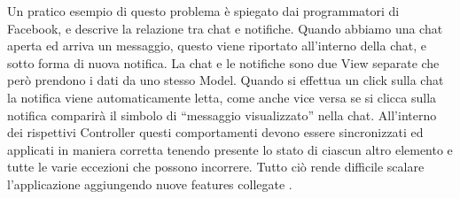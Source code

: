 Un pratico esempio di questo problema è spiegato dai programmatori di Facebook, e descrive la relazione tra chat e notifiche. Quando abbiamo una chat aperta ed arriva un messaggio, questo viene riportato all'interno della chat, e sotto forma di nuova notifica. La chat e le notifiche sono due View separate che però prendono i dati da uno stesso Model. Quando si effettua un click sulla chat la notifica viene automaticamente letta, come anche vice versa se si clicca sulla notifica comparirà il simbolo di “messaggio visualizzato” nella chat.
All'interno dei rispettivi Controller questi comportamenti devono essere sincronizzati ed applicati in maniera corretta tenendo presente lo stato di ciascun altro elemento e tutte le varie eccezioni che possono incorrere. Tutto ciò rende difficile scalare l'applicazione aggiungendo nuove features collegate \cite{JingChenOnMVCAndFlux}.
